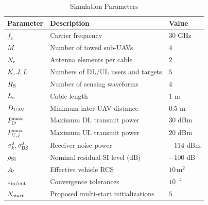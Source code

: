 \documentclass[letterpaper,journal]{IEEEtran}
\begin{document}
\begin{table}[!t]
\centering
\caption{Simulation Parameters}
\label{tab:simulation_parameters}
\footnotesize
\renewcommand{\arraystretch}{1.12}
\setlength{\tabcolsep}{2pt}

\begin{tabular}{
|>{\centering\arraybackslash}p{}
|p{}
|>{\centering\arraybackslash}p{}|
}
\hline
\textbf{Parameter} &
\textbf{Description} &
\textbf{Value} \\
\hline

$f_c$ &
Carrier frequency &
$30$ GHz \\
\hline

$M$ &
Number of towed sub-UAVs &
$4$ \\
\hline

$N_{\rm c}$ &
Antenna elements per cable &
$2$ \\
\hline

$K,J,L$ &
Numbers of DL/UL users and targets &
$5$ \\
\hline

$R_{\rm S}$ &
Number of sensing waveforms &
$4$ \\
\hline

$L_{\rm c}$ &
Cable length &
$1$ m \\
\hline

$D_{\rm UAV}$ &
Minimum inter-UAV distance &
$0.5$ m \\
\hline

$P_{\rm D}^{\max}$ &
Maximum DL transmit power &
$30$ dBm \\
\hline

$P_{{\rm U},j}^{\max}$ &
Maximum UL transmit power &
$20$ dBm \\
\hline

$\sigma_k^2,\sigma_{\rm BS}^2$ &
Receiver noise power &
$-114$ dBm \\
\hline

$\rho_{\rm SI}$ &
Nominal residual-SI level (dB) &
$-100$ dB \\
\hline

$A_l$ &
Effective vehicle RCS &
$10\,\mathrm{m}^2$ \\
\hline

$\varepsilon_{\rm in/out}$ &
Convergence tolerances &
$10^{-4}$ \\
\hline

$N_{\rm start}$ &
Proposed multi-start initializations &
$5$ \\
\hline

\end{tabular}
\end{table}
\end{document}
